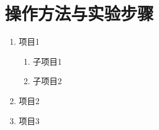 

\section{操作方法与实验步骤}

\begin{enumerate}
    \item 项目1
    \begin{enumerate}
        \item 子项目1
        \item 子项目2
    \end{enumerate}
    \item 项目2
    \item 项目3
\end{enumerate}
